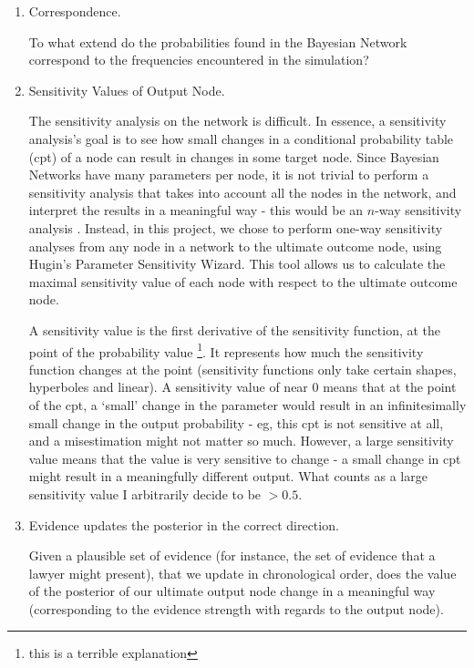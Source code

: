 \begin{enumerate}
\item Correspondence.

To what extend do the probabilities found in the Bayesian Network correspond to the frequencies encountered in the simulation? 

\item Sensitivity Values of Output Node.

The sensitivity analysis on the network is difficult. In essence, a sensitivity analysis's goal is to see how small changes in a conditional probability table (cpt) of a node can result in changes in some target node. Since Bayesian Networks have many parameters per node, it is not trivial to perform a sensitivity analysis that takes into account all the nodes in the network, and interpret the results in a meaningful way - this would be an $n$-way sensitivity analysis \citep{gaag2007}.  Instead, in this project, we chose to perform one-way sensitivity analyses from any node in a network to the ultimate outcome node, using Hugin's Parameter Sensitivity Wizard. This tool allows us to calculate the maximal sensitivity value of each node with respect to the ultimate outcome node. 

A sensitivity value is the first derivative of the sensitivity function, at the point of the probability value \footnote{this is a terrible explanation}. It represents how much the sensitivity function changes at the point (sensitivity functions only take certain shapes, hyperboles and linear). A sensitivity value of near 0 means that at the point of the cpt, a `small' change in the parameter would result in an infinitesimally small change in the output probability - eg, this cpt is not sensitive at all, and a misestimation might not matter so much. However, a large sensitivity value means that the value is very sensitive to change - a small change in cpt might result in a meaningfully different output. What counts as a large sensitivity value I arbitrarily decide to be $>0.5$.



\item Evidence updates the posterior in the correct direction.

Given a plausible set of evidence (for instance, the set of evidence that a lawyer might present), that we update in chronological order, does the value of the posterior of our ultimate output node change in a meaningful way (corresponding to the evidence strength with regards to the output node).

\end{enumerate}

